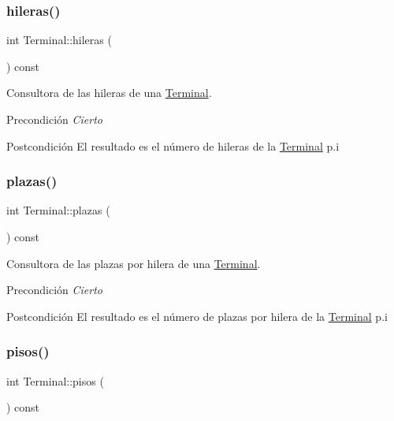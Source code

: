 \subsubsection{\texorpdfstring{hileras()}{hileras()}}
{\footnotesize\ttfamily int Terminal\+::hileras (\begin{DoxyParamCaption}{ }\end{DoxyParamCaption}) const}



Consultora de las hileras de una \hyperlink{class_terminal}{Terminal}. 

\begin{DoxyPrecond}{Precondición}
{\itshape Cierto} 
\end{DoxyPrecond}
\begin{DoxyPostcond}{Postcondición}
El resultado es el número de hileras de la \hyperlink{class_terminal}{Terminal} p.\+i 
\end{DoxyPostcond}
\mbox{\label{class_terminal_a06602e79ec9e7bca40d73d7a6c436fe3}} 
\subsubsection{\texorpdfstring{plazas()}{plazas()}}
{\footnotesize\ttfamily int Terminal\+::plazas (\begin{DoxyParamCaption}{ }\end{DoxyParamCaption}) const}



Consultora de las plazas por hilera de una \hyperlink{class_terminal}{Terminal}. 

\begin{DoxyPrecond}{Precondición}
{\itshape Cierto} 
\end{DoxyPrecond}
\begin{DoxyPostcond}{Postcondición}
El resultado es el número de plazas por hilera de la \hyperlink{class_terminal}{Terminal} p.\+i 
\end{DoxyPostcond}
\mbox{\label{class_terminal_ae6e79d13bb240d038142256552ae0ec9}} 
\subsubsection{\texorpdfstring{pisos()}{pisos()}}
{\footnotesize\ttfamily int Terminal\+::pisos (\begin{DoxyParamCaption}{ }\end{DoxyParamCaption}) const}



